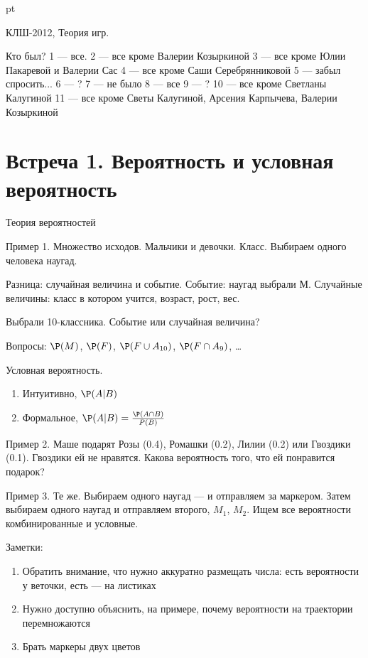 \documentclass[pdftex,12pt,a4paper]{article}
\begin{document}
 pt %

КЛШ-2012, Теория игр.

Кто был?
1 --- все.
2 --- все кроме Валерии Козыркиной
3 --- все кроме Юлии Пакаревой и Валерии Сас
4 --- все кроме Саши Серебрянниковой
5 --- забыл спросить...
6 --- ?
7 --- не было
8 --- все
9 --- ?
10 --- все кроме Светланы Калугиной
11 --- все кроме Светы Калугиной, Арсения Карпычева, Валерии Козыркиной

\section{Встреча 1. Вероятность и условная вероятность}

Теория вероятностей


Пример 1. Множество исходов. Мальчики и девочки. Класс. Выбираем одного человека наугад.


Разница: случайная величина и событие. Событие: наугад выбрали М. Случайные величины: класс в котором учится, возраст, рост, вес. 


Выбрали 10-классника. Событие или случайная величина?


Вопросы: $\P(M)$, $\P(F)$, $\P(F\cup A_{10})$, $\P(F\cap A_9)$, \ldots


Условная вероятность.

\begin{enumerate}
\item Интуитивно, $\P(A|B)$
\item Формальное, $\P(A|B)=\frac{\P(A\cap B)}{P(B)}$
\end{enumerate}


Пример 2. Маше подарят Розы (0.4), Ромашки (0.2), Лилии (0.2) или Гвоздики (0.1). Гвоздики ей не нравятся. Какова вероятность того, что ей понравится подарок?



Пример 3. Те же. Выбираем одного наугад --- и отправляем за маркером. Затем выбираем одного наугад и отправляем второго, $M_1$, $M_2$. Ищем все вероятности комбинированные и условные. 


Заметки:
\begin{enumerate}
\item Обратить внимание, что нужно аккуратно размещать числа: есть вероятности у веточки, есть --- на листиках
\item Нужно доступно объяснить, на примере, почему вероятности на траектории перемножаются
\item Брать маркеры двух цветов
\end{enumerate}
\end{document}
